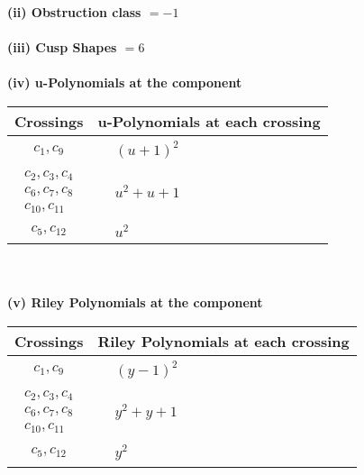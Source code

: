 \documentclass[1p]{elsarticle_modified}
\theoremstyle{definition}
\begin{document}
\flushleft \textbf{(ii) Obstruction class $= -1$}\\~\\
\flushleft \textbf{(iii) Cusp Shapes $= 6$}\\~\\
\newpage\renewcommand{\arraystretch}{1}
\flushleft \textbf{(iv) u-Polynomials at the component}\newline \\
\begin{tabular}{m{50pt}|m{274pt}}
Crossings & \hspace{64pt}u-Polynomials at each crossing \\
\hline $$\begin{aligned}c_{1},c_{9}\end{aligned}$$&$\begin{aligned}
&(u+1)^2
\end{aligned}$\\
\hline $$\begin{aligned}c_{2},c_{3},c_{4}\\c_{6},c_{7},c_{8}\\c_{10},c_{11}\end{aligned}$$&$\begin{aligned}
&u^2+u+1
\end{aligned}$\\
\hline $$\begin{aligned}c_{5},c_{12}\end{aligned}$$&$\begin{aligned}
&u^2
\end{aligned}$\\
\hline
\end{tabular}\\~\\
\newpage\renewcommand{\arraystretch}{1}
\flushleft \textbf{(v) Riley Polynomials at the component}\newline \\
\begin{tabular}{m{50pt}|m{274pt}}
Crossings & \hspace{64pt}Riley Polynomials at each crossing \\
\hline $$\begin{aligned}c_{1},c_{9}\end{aligned}$$&$\begin{aligned}
&(y-1)^2
\end{aligned}$\\
\hline $$\begin{aligned}c_{2},c_{3},c_{4}\\c_{6},c_{7},c_{8}\\c_{10},c_{11}\end{aligned}$$&$\begin{aligned}
&y^2+y+1
\end{aligned}$\\
\hline $$\begin{aligned}c_{5},c_{12}\end{aligned}$$&$\begin{aligned}
&y^2
\end{aligned}$\\
\hline
\end{tabular}\\~\\
\end{document}
